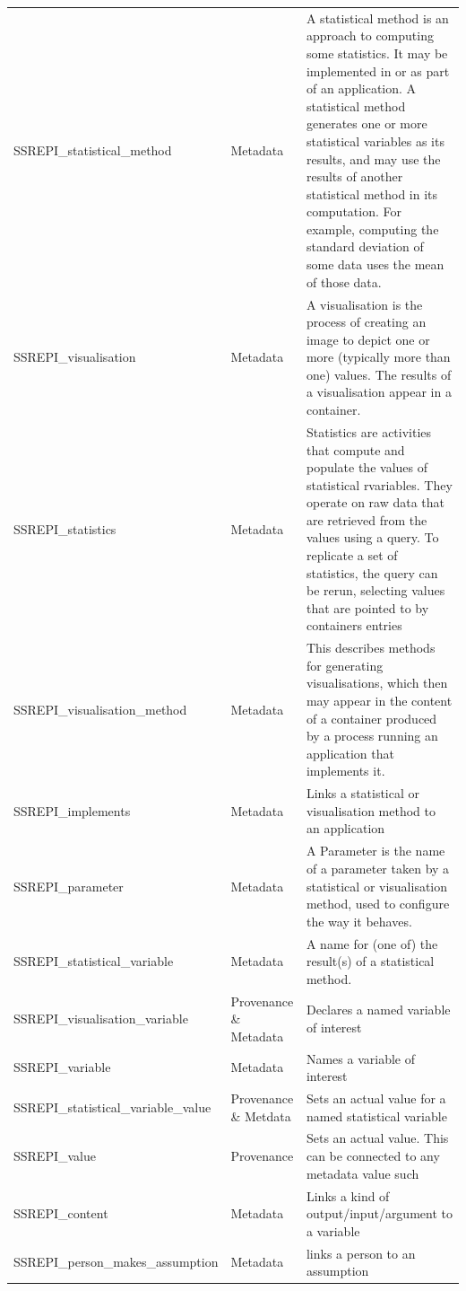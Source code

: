 \documentclass[runningheads]{llncs}
\begin{document}
\begin{table}
\begin{tabularx}{\textwidth}{|l|p{2cm}|p{6cm}|}
        SSREPI\_statistical\_method & Metadata & A statistical method is an approach to computing some statistics. It may be implemented in or as part of an application. A statistical method generates one or more statistical variables as its results, and may use the results of another statistical method in its computation. For example, computing the standard deviation of some data uses the mean of those data. \\
        SSREPI\_visualisation & Metadata & A visualisation is the process of creating an image to depict one or more (typically more than one) values. The results of a visualisation appear in a container.\\
        SSREPI\_statistics & Metadata & Statistics are activities that compute  and populate the values of statistical rvariables. They operate on raw data that are retrieved from the values using a query. To replicate a set of statistics, the query can be rerun, selecting values that are pointed to by containers entries \\
        SSREPI\_visualisation\_method & Metadata & This describes methods for generating visualisations, which then may appear in the content of a container produced by a process running an application that implements it. \\
    
        SSREPI\_implements & Metadata & Links a statistical or visualisation method to an application \\
        SSREPI\_parameter & Metadata & A Parameter is the name of a parameter taken by a statistical or visualisation method, used to configure the way it behaves. \\
        SSREPI\_statistical\_variable & Metadata &  A name for (one of) the result(s) of a statistical method. \\
        SSREPI\_visualisation\_variable & Provenance \& Metadata & Declares a named variable of interest \\
        SSREPI\_variable & Metadata & Names a variable of interest \\
        SSREPI\_statistical\_variable\_value & Provenance \& Metdata & Sets an actual value for a named statistical variable \\
        SSREPI\_value & Provenance & Sets an actual value. This can be connected to any metadata value such         \\ 
        SSREPI\_content & Metadata & Links a kind of output/input/argument to a variable  \\
        SSREPI\_person\_makes\_assumption & Metadata & links a person to an assumption \\
\hline
\end{tabularx}
\end{table}
\end{document}
